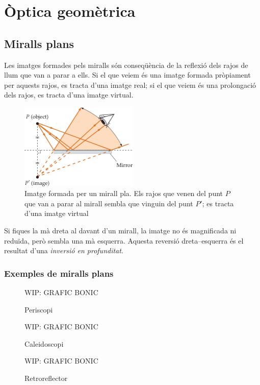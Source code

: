 \section{Òptica geomètrica}
\subsection{Miralls plans}
Les imatges formades pels miralls són conseqüència de la reflexió dels rajos de llum que van a parar a ells. Si el que veiem és una imatge formada pròpiament per aquests rajos, es tracta d'una imatge real; si el que veiem és una prolongació dels rajos, es tracta d'una imatge virtual.
\begin{figure}[H]
\centering
    \includegraphics[width=0.5\textwidth]{images/4/41-mirall-pla.png}
\caption{Imatge formada per un mirall pla. Els rajos que venen del punt $P$ que van a parar al mirall sembla que vinguin del punt $P'$; es tracta d'una imatge virtual}
\end{figure}
Si fiques la mà dreta al davant d'un mirall, la imatge no és magnificada ni reduïda, però sembla una mà esquerra. Aquesta reversió dreta--esquerra és el resultat d'una \emph{inversió en profunditat}.

\subsubsection*{Exemples de miralls plans}
\begin{figure}[H]
\centering
    WIP: GRAFIC BONIC 
\caption{Periscopi}
\end{figure}

\begin{figure}[H]
\centering
    WIP: GRAFIC BONIC 
\caption{Caleidoscopi}
\end{figure}

\begin{figure}[H]
\centering
    WIP: GRAFIC BONIC 
\caption{Retroreflector}
\end{figure}

